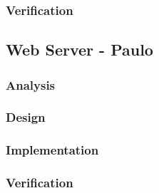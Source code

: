 \subsubsection{Verification}
%
%


\subsection{Web Server - Paulo}

%
%
\subsubsection{Analysis}
%
%
%
\subsubsection{Design}
%
%
%
\subsubsection{Implementation}
%
%
\subsubsection{Verification}
%
%



